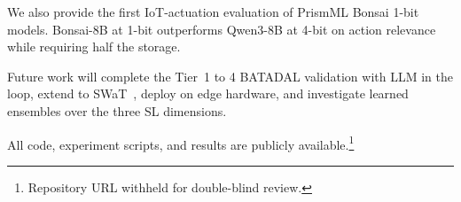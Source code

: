 \documentclass[conference]{IEEEtran}
\begin{document}
We also provide the first IoT-actuation evaluation of PrismML Bonsai 1-bit models. Bonsai-8B at 1-bit outperforms Qwen3-8B at 4-bit on action relevance while requiring half the storage.

Future work will complete the Tier~1 to 4 BATADAL validation with LLM in the loop, extend to SWaT~\cite{goh2017swat}, deploy on edge hardware, and investigate learned ensembles over the three SL dimensions.

All code, experiment scripts, and results are publicly available.\footnote{Repository URL withheld for double-blind review.}

\balance


\end{document}
